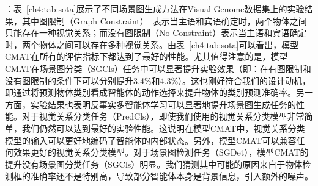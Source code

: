 \textbf{}：表~\ref{ch4:tab:sota}展示了不同场景图生成方法在Visual Genome数据集上的实验结果，其中图限制（Graph Constraint）~\cite{zellers2018neural}表示当主语和宾语确定时，两个物体之间只能存在一种视觉关系；而没有图限制（No Constraint）表示当主语和宾语确定时，两个物体之间可以存在多种视觉关系。由表~\ref{ch4:tab:sota}可以看出，模型CMAT在所有的评估指标下都达到了最好的性能。尤其值得注意的是，模型CMAT在场景图分类（SGCls）任务中可以显著提升实验效果（即：在有图限制和没有图限制的条件下可以分别提升3.4\%和4.3\%）。这也刚好符合我们的设计动机，即通过将预测物体类别看成智能体的动作选择来提升物体的类别预测准确率。另一方面，实验结果也表明反事实多智能体学习可以显著地提升场景图生成任务的性能。对于视觉关系分类任务（PredCls），即使我们使用的视觉关系分类模型非常简单，我们仍然可以达到最好的实验性能。这说明在模型CMAT中，视觉关系分类模型的输入可以更好地编码了智能体的内部状态。另外，模型CMAT可以兼容任何效果更好的视觉关系分类模型。对于场景图检测任务（SGDet），模型CMAT的提升没有场景图分类任务（SGCls）明显。我们猜测其中可能的原因来自于物体检测框的准确率还不是特别高，导致部分智能体本身是背景信息，引入额外的噪声。


